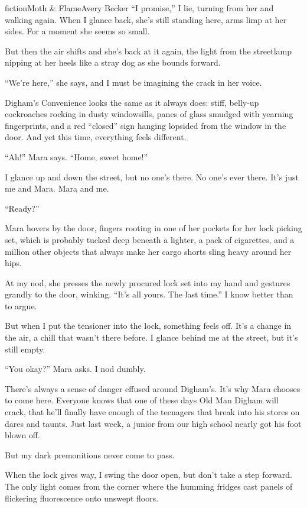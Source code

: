 \begin{prose}{fiction}{Moth \& Flame}{Avery Becker}
“I promise,” I lie, turning from her and walking again. When I glance back, she's still standing here, arms limp at her sides. For a moment she seems so small. \par
But then the air shifts and she's back at it again, the light from the streetlamp nipping at her heels like a stray dog as she bounds forward. \par
“We're here,” she says, and I must be imagining the crack in her voice.\par
Digham's Convenience looks the same as it always does: stiff, belly-up cockroaches rocking in dusty windowsills, panes of glass smudged with yearning fingerprints, and a red “closed” sign hanging lopsided from the window in the door. And yet this time, everything feels different.\par
“Ah!” Mara says. “Home, sweet home!”\par
I glance up and down the street, but no one's there. No one's ever there. It's just me and Mara. Mara and me. \par
“Ready?” \par
Mara hovers by the door, fingers rooting in one of her pockets for her lock picking set, which is probably tucked deep beneath a lighter, a pack of cigarettes, and a million other objects that always make her cargo shorts sling heavy around her hips. \par
At my nod, she presses the newly procured lock set into my hand and gestures grandly to the door, winking. “It's all yours. The last time.” I know better than to argue.\par
But when I put the tensioner into the lock, something feels off. It's a change in the air, a chill that wasn't there before. I glance behind me at the street, but it's still empty. \par
“You okay?” Mara asks. I nod dumbly. \par
There's always a sense of danger effused around Digham's. It's why Mara chooses to come here. Everyone knows that one of these days Old Man Digham will crack, that he'll finally have enough of the teenagers that break into his stores on dares and taunts. Just last week, a junior from our high school nearly got his foot blown off. \par
But my dark premonitions never come to pass. \par
When the lock gives way, I swing the door open, but don't take a step forward. The only light comes from the corner where the humming fridges cast panels of flickering fluorescence onto unswept floors.\par

\end{prose}
